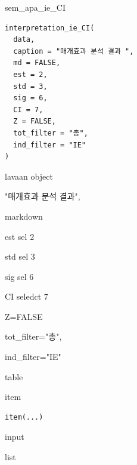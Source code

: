 \documentclass[a4paper]{book}
\begin{document}
%
\begin{Description}
sem\_apa\_ie\_CI
\end{Description}
%
\begin{Usage}
\begin{verbatim}
interpretation_ie_CI(
  data,
  caption = "매개효과 분석 결과 ",
  md = FALSE,
  est = 2,
  std = 3,
  sig = 6,
  CI = 7,
  Z = FALSE,
  tot_filter = "총",
  ind_filter = "IE"
)
\end{verbatim}
\end{Usage}
%
\begin{Arguments}
\begin{ldescription}
\item[\code{data}] lavaan object

\item[\code{caption}] "매개효과 분석 결과",

\item[\code{md}] markdown

\item[\code{est}] est sel 2

\item[\code{std}] std sel 3

\item[\code{sig}] sig sel 6

\item[\code{CI}] CI seledct 7

\item[\code{Z}] Z=FALSE

\item[\code{tot\_filter}] tot\_filter="총",

\item[\code{ind\_filter}] ind\_filter="IE"
\end{ldescription}
\end{Arguments}
%
\begin{Value}
table
\end{Value}

%
\begin{Description}
item
\end{Description}
%
\begin{Usage}
\begin{verbatim}
item(...)
\end{verbatim}
\end{Usage}
%
\begin{Arguments}
\begin{ldescription}
\item[\code{...}] input
\end{ldescription}
\end{Arguments}
%
\begin{Value}
list
\end{Value}
\end{document}
